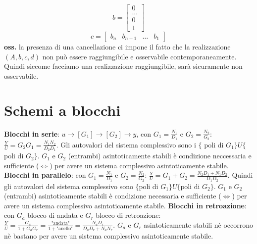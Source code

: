     \[
        b=\left[\begin{matrix}
            0\\\dots\\0\\1
        \end{matrix}\right]
    \]
    \[
        c=\left[\begin{matrix}
            b_n & b_{n-1} & \dots & b_1
        \end{matrix}\right]
    \]
    \textbf{oss.} la presenza di una cancellazione ci impone il fatto che la realizzazione
    $ (A, b, c, d)$ non può essere raggiungibile e osservabile contemporaneamente. Quindi siccome facciamo una realizzazione raggiungibile, sarà sicuramente non osservabile.
    \newpage\section{Schemi a blocchi}
    \textbf{Blocchi in serie}: $u \rightarrow [G_1] \rightarrow  [G_2] \rightarrow y$, con $G_1 = \frac{N_1}{D_1}$ e $G_2 = \frac{N_2}{G_2}$: $\frac{Y}{U} = G_2G_1 = \frac{N_1N_2}{D_2D_1}$.\newline 
    Gli autovalori del sistema complessivo sono i $\{$ poli di $G_1\} U \{$ poli di $G_2\}$.\newline
    $G_1$ e $G_2$ (entrambi) asintoticamente stabili è condizione neccessaria e sufficiente ($\Leftrightarrow$) per avere un sistema complessivo asintoticamente stabile.\newline
    \newline
    \textbf{Blocchi in parallelo}: con $G_1 = \frac{N_1}{D_1}$ e $G_2 = \frac{N_2}{G_2}$: $\frac{Y}{U} = G_1 + G_2 = \frac{N_2D_1 + N_1 D_2}{D_1D_2}$.\newline
    Quindi gli autovalori del sistema complessivo sono $\{\text{poli di $G_1$}\} U \{\text{poli di $G_2$}\}$.\newline
    $G_1$ e $G_2$ (entrambi) asintoticamente stabili è condizione necessaria e sufficiente ($\Leftrightarrow$) per avere un sistema complessivo asintoticamente stabile.\newline
    \newline
    \textbf{Blocchi in retroazione}: con $G_a$ blocco di andata e $G_r$ blocco di retroazione: $\frac{Y}{U} = \frac{G_a}{1 + G_aG_r} = \frac{\text{"andata"}}{1+ \text{"anello"}} = \frac{N_aD_r}{D_aD_r +N_aN_r}$. \newline
    $G_a$ e $G_r$ asintoticamente stabili nè occorrono nè bastano per avere un sistema complessivo asintoticamente stabile.
